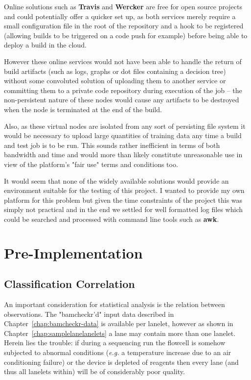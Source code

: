Online solutions such as \textbf{Travis}\citep{travis-ci} and
\textbf{Wercker}\citep{wercker} are free for open source projects and could
potentially offer a quicker set up, as both services merely require a small
configuration file in the root of the repository and a hook to be registered
(allowing builds to be triggered on a code push for example) before being able
to deploy a build in the cloud.

However these online services would not have been able to handle the return of
build artifacts (such as logs, graphs or dot files containing a decision tree)
without some convoluted solution of uploading them to another service or
committing them to a private code repository during execution of the job -- the
non-persistent nature of these nodes would cause any artifacts to be destroyed
when the node is terminated at the end of the build.

Also, as these virtual nodes are isolated from any sort of persisting file
system it would be necessary to upload large quantities of training data any
time a build and test job is to be run. This sounds rather inefficient in terms
of both bandwidth and time and would more than likely constitute unreasonable
use in view of the platform's "fair use" terms and conditions too.

It would seem that none of the widely available solutions would provide an
environment suitable for the testing of this project. I wanted to provide my
own platform for this problem but given the time constraints of the project this
was simply not practical and in the end we settled for well formatted log files
which could be searched and processed with command line tools such as
\textbf{awk}.


\chapter{Pre-Implementation}
\section{Classification Correlation}

An important consideration for statistical analysis is the relation between
observations. The "bamcheckr'd" input data described in
Chapter~\ref{chap:bamcheckr-data} is available per lanelet, however as shown in
Chapter~\ref{chap:samplelanelanelets} a lane may contain more than one lanelet.
Herein lies the trouble: if during a sequencing run the flowcell is somehow
subjected to abnormal conditions (\textit{e.g.} a temperature increase due to an air
conditioning failure) or the device is depleted of reagents then every lane (and
thus all lanelets within) will be of considerably poor quality.

